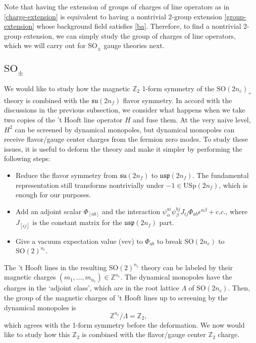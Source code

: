 \documentclass[12pt]{article}
\numberwithin{equation}{section}
\def\bZ{\mathbb{Z}}
\def\SO{\mathrm{SO}}
\def\USp{\mathrm{USp}}
\def\su{\mathfrak{su}}
\def\usp{\mathfrak{usp}}
\begin{document}
Note that having the extension of groups of charges of line operators as in \eqref{charge-extension}
is equivalent to having a nontrivial 2-group extension \eqref{group-extension} 
whose background field satisfies \eqref{ba}.
Therefore, to find a nontrivial 2-group extension, we can simply study the group of charges of line operators,
which we will carry out for $\SO_\pm$ gauge theories next.

\subsection{$\SO_\pm$}

We would like to study how the magnetic $\bZ_2$ 1-form symmetry of the $\SO(2n_c)_+$ theory is combined with the $\su(2n_f)$ flavor symmetry.
In accord with the discussions in the previous subsection, 
we consider what happens when we take two copies of the 't Hooft line operator $H$ and fuse them.
At the very naive level, $H^2$ can be screened by dynamical monopoles,
but dynamical monopoles can receive flavor/gauge center charges from the fermion zero modes.
To study these issues, it is useful to deform the theory and make it simpler
by performing the following steps:
\begin{itemize}
\item Reduce the flavor symmetry from $\su(2n_f)$ to $\usp(2n_f)$. 
The fundamental representation still transforms nontrivially under $-1\in \USp(2n_f)$, which is enough for our purposes.
\item Add an adjoint scalar $\Phi_{[ab]}$ and the interaction $\psi^{ai}_\alpha \psi^{bj}_\beta J_{ij} \Phi_{ab}\epsilon^{\alpha\beta} +c.c.$, where $J_{[ij]}$ is the constant matrix for the $\usp(2n_f)$ part.
\item Give a vacuum expectation value (vev) to $\Phi_{ab}$ to break $\SO(2n_c)$ to $\SO(2)^{n_c}$.
\end{itemize}

The 't Hooft lines in the resulting $\SO(2)^{n_c}$ theory can be labeled by their magnetic charges $(m_1,\ldots,m_{n_c})\in \bZ^{n_c}$.
The dynamical monopoles have the charges in the `adjoint class', which are
in the root lattice $\Lambda$ of $\SO(2n_c)$. 
Then, the group of the magnetic charges of 't Hooft lines up to screening by the dynamical monopoles is \begin{equation}
\bZ^{n_c}/\Lambda = \bZ_2,
\end{equation}
which agrees with the 1-form symmetry before the deformation.
We now would like to study how this $\bZ_2$ is combined with the flavor/gauge center $\bZ_2$ charge.
\end{document}
